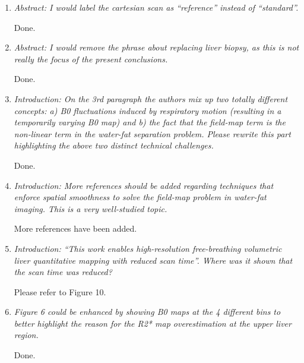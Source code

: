 \documentclass[a4paper,11pt]{report}
\begin{document}
\begin{enumerate}[resume]

	\item \textit{Abstract: I would label the cartesian scan as “reference” instead of “standard”.}

\hspace{1em} Done.

	\item \textit{Abstract: I would remove the phrase about replacing liver biopsy, as this is not really the focus of the present conclusions.}

\hspace{1em} Done.

	\item \textit{Introduction: On the 3rd paragraph the authors mix up two totally different concepts: a) B0 fluctuations induced by respiratory motion (resulting in a temporarily varying B0 map) and b) the fact that the field-map term is the non-linear term in the water-fat separation problem. Please rewrite this part highlighting the above two distinct technical challenges.}
	
\hspace{1em} Done.

	\item \textit{Introduction: More references should be added regarding techniques that enforce spatial smoothness to solve the field-map problem in water-fat imaging. This is a very well-studied topic.}

\hspace{1em} More references have been added.

	\item \textit{Introduction: “This work enables high-resolution free-breathing volumetric liver quantitative mapping with reduced scan time”. Where was it shown that the scan time was reduced?}

\hspace{1em} Please refer to Figure 10. %

	\item \textit{Figure 6 could be enhanced by showing B0 maps at the 4 different bins to better highlight the reason for the R2* map overestimation at the upper liver region.}
	
\hspace{1em} Done.

\end{enumerate}

\vfill
\pagebreak
\end{document}
